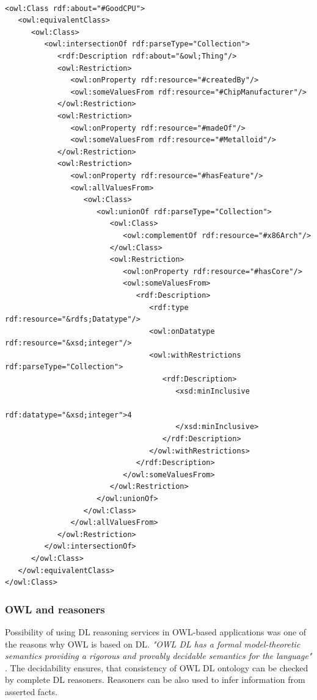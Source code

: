 {\tt \footnotesize
\begin{verbatim}
<owl:Class rdf:about="#GoodCPU">
   <owl:equivalentClass>
      <owl:Class>
         <owl:intersectionOf rdf:parseType="Collection">
            <rdf:Description rdf:about="&owl;Thing"/>
            <owl:Restriction>
               <owl:onProperty rdf:resource="#createdBy"/>
               <owl:someValuesFrom rdf:resource="#ChipManufacturer"/>
            </owl:Restriction>
            <owl:Restriction>
               <owl:onProperty rdf:resource="#madeOf"/>
               <owl:someValuesFrom rdf:resource="#Metalloid"/>
            </owl:Restriction>
            <owl:Restriction>
               <owl:onProperty rdf:resource="#hasFeature"/>
               <owl:allValuesFrom>
                  <owl:Class>
                     <owl:unionOf rdf:parseType="Collection">
                        <owl:Class>
                           <owl:complementOf rdf:resource="#x86Arch"/>
                        </owl:Class>
                        <owl:Restriction>
                           <owl:onProperty rdf:resource="#hasCore"/>
                           <owl:someValuesFrom>
                              <rdf:Description>
                                 <rdf:type rdf:resource="&rdfs;Datatype"/>
                                 <owl:onDatatype rdf:resource="&xsd;integer"/>
                                 <owl:withRestrictions rdf:parseType="Collection">
                                    <rdf:Description>
                                       <xsd:minInclusive 
                                            rdf:datatype="&xsd;integer">4
                                       </xsd:minInclusive>
                                    </rdf:Description>
                                 </owl:withRestrictions>
                              </rdf:Description>
                           </owl:someValuesFrom>
                        </owl:Restriction>
                     </owl:unionOf>
                  </owl:Class>
               </owl:allValuesFrom>
            </owl:Restriction>
         </owl:intersectionOf>
      </owl:Class>
   </owl:equivalentClass>
</owl:Class>
\end{verbatim}
}

\subsubsection{OWL and reasoners}
\label{sub:owlAndReasoners}

Possibility of using DL reasoning services in OWL-based applications was one of the reasons why OWL is based on DL. \textit{"OWL DL has a formal model-theoretic semantics providing a rigorous and provably decidable semantics for the language"} \cite{HLP08}. The decidability ensures, that consistency of OWL DL ontology can be checked by complete DL reasoners. Reasoners can be also used to infer information from asserted facts. 

